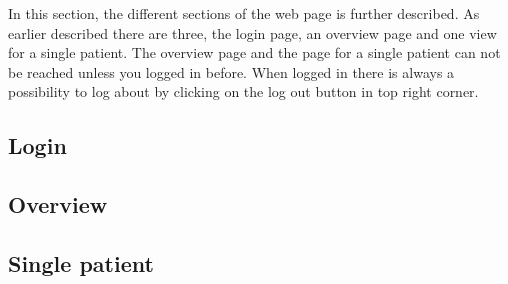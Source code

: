 In this section, the different sections of the web page is further described. As earlier described there are three, the login page, an overview page and one view for a single patient. The overview page and the page for a single patient can not be reached unless you logged in before. When logged in there is always a possibility to log about by clicking on the log out button in top right corner. 

\subsection{Login}
    
\pagebreak
\subsection{Overview}
    
\pagebreak
\subsection{Single patient}
    